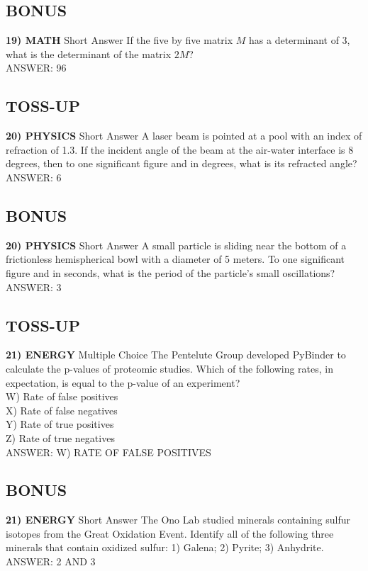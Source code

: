 \documentclass{article}
\begin{document}
\subsection*{BONUS}
\textbf{19) MATH} Short Answer If the five by five matrix $M$ has a determinant of 3, what is the determinant of the matrix $2M$?
\\ANSWER: 96

\subsection*{TOSS-UP}
\textbf{20) PHYSICS} Short Answer A laser beam is pointed at a pool with an index of refraction of 1.3. If the incident angle of the beam at the air-water interface is 8 degrees, then to one significant figure and in degrees, what is its refracted angle?
\\ANSWER: 6

\subsection*{BONUS}
\textbf{20) PHYSICS} Short Answer A small particle is sliding near the bottom of a frictionless hemispherical bowl with a diameter of 5 meters. To one significant figure and in seconds, what is the period of the particle's small oscillations?
\\ANSWER: 3

\subsection*{TOSS-UP}
\textbf{21) ENERGY} Multiple Choice The Pentelute Group developed PyBinder to calculate the p-values of proteomic studies. Which of the following rates, in expectation, is equal to the p-value of an experiment?
\\W) Rate of false positives
\\X) Rate of false negatives
\\Y) Rate of true positives
\\Z) Rate of true negatives
\\ANSWER: W) RATE OF FALSE POSITIVES

\subsection*{BONUS}
\textbf{21) ENERGY} Short Answer The Ono Lab studied minerals containing sulfur isotopes from the Great Oxidation Event. Identify all of the following three minerals that contain oxidized sulfur: 1) Galena; 2) Pyrite; 3) Anhydrite.
\\ANSWER: 2 AND 3
\end{document}
